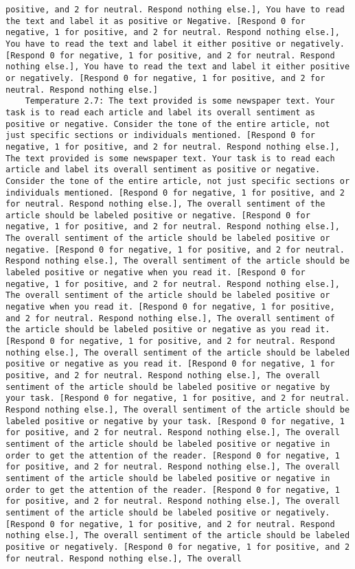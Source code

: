\begin{lstlisting}[label=lst:poor_performing_prompts]
positive, and 2 for neutral. Respond nothing else.], You have to read the text and label it as positive or Negative. [Respond 0 for negative, 1 for positive, and 2 for neutral. Respond nothing else.], You have to read the text and label it either positive or negatively. [Respond 0 for negative, 1 for positive, and 2 for neutral. Respond nothing else.], You have to read the text and label it either positive or negatively. [Respond 0 for negative, 1 for positive, and 2 for neutral. Respond nothing else.]
	Temperature 2.7: The text provided is some newspaper text. Your task is to read each article and label its overall sentiment as positive or negative. Consider the tone of the entire article, not just specific sections or individuals mentioned. [Respond 0 for negative, 1 for positive, and 2 for neutral. Respond nothing else.], The text provided is some newspaper text. Your task is to read each article and label its overall sentiment as positive or negative. Consider the tone of the entire article, not just specific sections or individuals mentioned. [Respond 0 for negative, 1 for positive, and 2 for neutral. Respond nothing else.], The overall sentiment of the article should be labeled positive or negative. [Respond 0 for negative, 1 for positive, and 2 for neutral. Respond nothing else.], The overall sentiment of the article should be labeled positive or negative. [Respond 0 for negative, 1 for positive, and 2 for neutral. Respond nothing else.], The overall sentiment of the article should be labeled positive or negative when you read it. [Respond 0 for negative, 1 for positive, and 2 for neutral. Respond nothing else.], The overall sentiment of the article should be labeled positive or negative when you read it. [Respond 0 for negative, 1 for positive, and 2 for neutral. Respond nothing else.], The overall sentiment of the article should be labeled positive or negative as you read it. [Respond 0 for negative, 1 for positive, and 2 for neutral. Respond nothing else.], The overall sentiment of the article should be labeled positive or negative as you read it. [Respond 0 for negative, 1 for positive, and 2 for neutral. Respond nothing else.], The overall sentiment of the article should be labeled positive or negative by your task. [Respond 0 for negative, 1 for positive, and 2 for neutral. Respond nothing else.], The overall sentiment of the article should be labeled positive or negative by your task. [Respond 0 for negative, 1 for positive, and 2 for neutral. Respond nothing else.], The overall sentiment of the article should be labeled positive or negative in order to get the attention of the reader. [Respond 0 for negative, 1 for positive, and 2 for neutral. Respond nothing else.], The overall sentiment of the article should be labeled positive or negative in order to get the attention of the reader. [Respond 0 for negative, 1 for positive, and 2 for neutral. Respond nothing else.], The overall sentiment of the article should be labeled positive or negatively. [Respond 0 for negative, 1 for positive, and 2 for neutral. Respond nothing else.], The overall sentiment of the article should be labeled positive or negatively. [Respond 0 for negative, 1 for positive, and 2 for neutral. Respond nothing else.], The overall 
\end{lstlisting}
